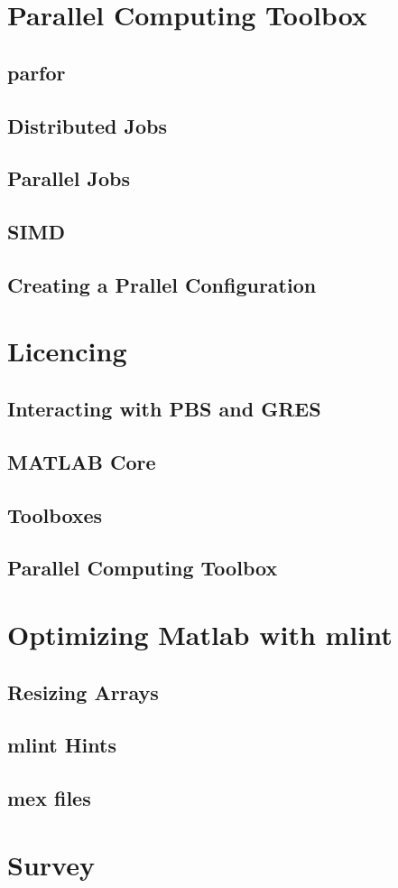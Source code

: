 \documentclass[handout]{beamer}
\begin{document}
  \section{Parallel Computing Toolbox}
   \subsection{parfor}
   \subsection{Distributed Jobs}
   \subsection{Parallel Jobs}
   \subsection{SIMD}
   \subsection{Creating a Prallel Configuration}
  \section {Licencing}
   \subsection {Interacting with PBS and GRES}
   \subsection {MATLAB Core}
   \subsection {Toolboxes}
   \subsection {Parallel Computing Toolbox}
  \section{Optimizing Matlab with mlint}
   \subsection {Resizing Arrays}
   \subsection {mlint Hints}
   \subsection {mex files}
  \section{ Survey }
\end{document}
